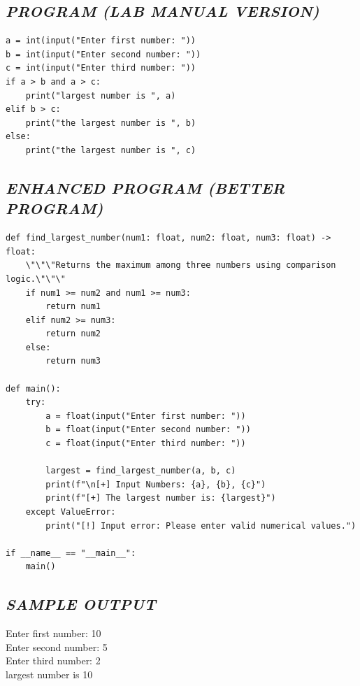 \documentclass[11pt,a4paper]{article}
\begin{document}
\subsection*{\textit{PROGRAM (LAB MANUAL VERSION)}}
\begin{lstlisting}[style=pythonstyle]
a = int(input("Enter first number: ")) 
b = int(input("Enter second number: ")) 
c = int(input("Enter third number: "))
if a > b and a > c: 
    print("largest number is ", a) 
elif b > c: 
    print("the largest number is ", b) 
else: 
    print("the largest number is ", c)
\end{lstlisting}

\subsection*{\textit{ENHANCED PROGRAM (BETTER PROGRAM)}}
\begin{lstlisting}[style=pythonstyle]
def find_largest_number(num1: float, num2: float, num3: float) -> float:
    \"\"\"Returns the maximum among three numbers using comparison logic.\"\"\"
    if num1 >= num2 and num1 >= num3:
        return num1
    elif num2 >= num3:
        return num2
    else:
        return num3

def main():
    try:
        a = float(input("Enter first number: "))
        b = float(input("Enter second number: "))
        c = float(input("Enter third number: "))
        
        largest = find_largest_number(a, b, c)
        print(f"\n[+] Input Numbers: {a}, {b}, {c}")
        print(f"[+] The largest number is: {largest}")
    except ValueError:
        print("[!] Input error: Please enter valid numerical values.")

if __name__ == "__main__":
    main()
\end{lstlisting}

\subsection*{\textit{SAMPLE OUTPUT}}
\begin{tcolorbox}[colback=black!85,colframe=navyblue,title=\textbf{Terminal Output},coltitle=white,fonttitle=\bfseries\small]
\small\ttfamily\color{green!30!white}
Enter first number: 10\\
Enter second number: 5\\
Enter third number: 2\\
largest number is 10
\end{tcolorbox}
\end{document}
